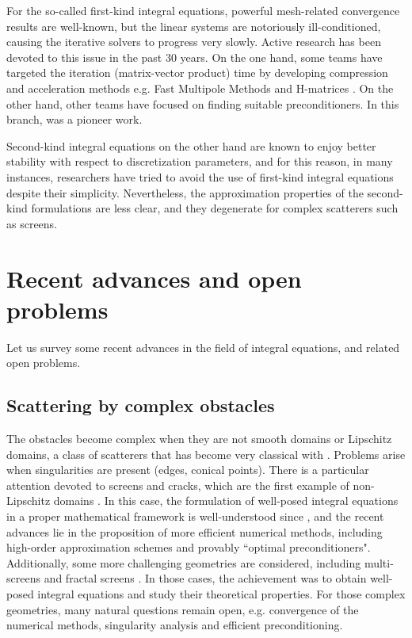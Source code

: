 \documentclass[]{article}
\begin{document}
For the so-called first-kind integral equations, powerful mesh-related convergence results are well-known, but the linear systems are notoriously ill-conditioned, causing the iterative solvers to progress very slowly. Active research has been devoted to this issue in the past 30 years. On the one hand, some teams have targeted the iteration (matrix-vector product) time by developing compression and acceleration methods e.g. Fast Multipole Methods \cite{greengard1987fast} and H-matrices \cite{hackbusch1999sparse}. On the other hand, other teams have focused on finding suitable preconditioners. In this branch, \cite{steinbach1998construction} was a pioneer work. 

Second-kind integral equations on the other hand are known to enjoy better stability with respect to discretization parameters, and for this reason, in many instances, researchers have tried to avoid the use of first-kind integral equations despite their simplicity. Nevertheless, the approximation properties of the second-kind formulations are less clear, and they degenerate for complex scatterers such as screens. 


\section{Recent advances and open problems}

Let us survey some recent advances in the field of integral equations, and related open problems.

\subsection*{Scattering by complex obstacles}

The obstacles become complex when they are not smooth domains or Lipschitz domains, a class of scatterers that has become very classical with \cite{mclean2000strongly}. Problems arise when singularities are present (edges, conical points). There is a particular attention devoted to screens and cracks, which are the first example of non-Lipschitz domains \cite{bruno2013high,gimperlein2019optimal,hiptmair2018closed,hiptmair2019preconditioning,ramaciotti2017some}. In this case, the formulation of well-posed integral equations in a proper mathematical framework is well-understood since \cite{stephan1984augmented,wendland1990hypersingular}, and the recent advances lie in the proposition of more efficient numerical methods, including high-order approximation schemes and provably ``optimal preconditioners". Additionally, some more challenging geometries are considered, including multi-screens \cite{claeys2013integral,claeys2020quotient} and fractal screens \cite{chandlerWilde2017sobolev}. In those cases, the achievement was to obtain well-posed integral equations and study their theoretical properties. For those complex geometries, many natural questions remain open, e.g. convergence of the numerical methods, singularity analysis and efficient preconditioning. 
\end{document}
